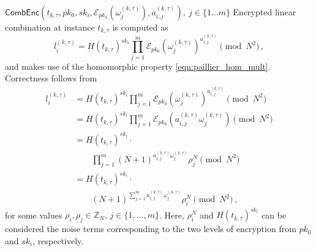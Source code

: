 \documentclass[10pt,letterpaper,oneside,twocolumn,journal]{IEEEtran}
\theoremstyle{definition}
\theoremstyle{definition}
\theoremstyle{remark}
\begin{document}
\begin{LaTeXdescription}
    \item[$\mathsf{CombEnc}(t_{k,\tau}, pk_0, sk_i, \mathcal{E}_{pk_0}(\omega_j^{(k,\tau)}), a^{(k,\tau)}_{i,j}),\ j\in\{1\dots m\}$] Encrypted linear combination at instance $t_{k,\tau}$ is computed as 
    \begin{equation}
        l^{(k,\tau)}_i = H(t_{k,\tau})^{sk_i}\prod^{m}_{j=1}\mathcal{E}_{pk_0}(\omega^{(k,\tau)}_j)^{a^{(k,\tau)}_{i,j}} \pmod{N^2}\,,\label{eqn:our_scheme_lin_comb}
    \end{equation}
    and makes use of the homomorphic property \eqref{eqn:paillier_hom_mult}. Correctness follows from
    \begin{equation*}
        \begin{split}
            l^{(k,\tau)}_i &= H(t_{k,\tau})^{sk_i}\prod^{m}_{j=1}\mathcal{E}_{pk_0}(\omega^{(k,\tau)}_j)^{a^{(k,\tau)}_{i,j}} \pmod{N^2} \\
            &= H(t_{k,\tau})^{sk_i}\prod^{m}_{j=1}\mathcal{E}_{pk_0}(a^{(k,\tau)}_{i,j}\omega^{(k,\tau)}_j) \pmod{N^2} \\
            &= H(t_{k,\tau})^{sk_i}\cdot \\
            &\qquad \prod^{m}_{j=1}(N+1)^{a^{(k,\tau)}_{i,j}\omega^{(k,\tau)}_j} \rho^{N}_{j} \pmod{N^2} \\
            &= H(t_{k,\tau})^{sk_i}\cdot \\
            &\qquad (N+1)^{\sum^{m}_{j=1}a^{(k,\tau)}_{i,j}\omega^{(k,\tau)}_j} \rho_{i}^{N} \pmod{N^2}\,,
        \end{split}
    \end{equation*}
    for some values $\rho_i,\rho_j \in \mathbb{Z}_N,\,j\in\{1,\dots,m\}$. Here, $\rho_i^N$ and $H(t_{k,\tau})^{sk_i}$ can be considered the noise terms corresponding to the two levels of encryption from $pk_0$ and $sk_i$, respectively.


\end{LaTeXdescription}
\end{document}
